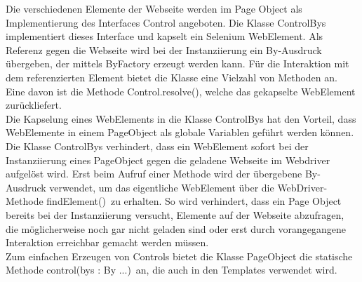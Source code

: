 Die verschiedenen Elemente der Webseite werden im Page Object als Implementierung des Interfaces Control angeboten.
Die Klasse ControlBys implementiert dieses Interface und kapselt ein Selenium WebElement. Als Referenz gegen die Webseite wird bei der Instanziierung ein By-Ausdruck übergeben, der mittels ByFactory erzeugt werden kann.
Für die Interaktion mit dem referenzierten Element bietet die Klasse eine Vielzahl von Methoden an. Eine davon ist die Methode \grq Control.resolve()\grq, welche das gekapselte WebElement zurückliefert.\\
Die Kapselung eines WebElements in die Klasse ControlBys hat den Vorteil, dass WebElemente in einem PageObject als globale Variablen geführt werden können.
Die Klasse ControlBys verhindert, dass ein WebElement sofort bei der Instanziierung eines PageObject gegen die geladene Webseite im Webdriver aufgelöst wird. Erst beim Aufruf einer Methode wird der übergebene By-Ausdruck verwendet, um das eigentliche WebElement über die WebDriver-Methode \grq findElement()\grq\ zu erhalten.
So wird verhindert, dass ein Page Object bereits bei der Instanziierung versucht, Elemente auf der Webseite abzufragen, die möglicherweise noch gar nicht geladen sind oder erst durch vorangegangene Interaktion erreichbar gemacht werden müssen.\\ Zum einfachen Erzeugen von Controls bietet die Klasse PageObject die statische Methode \grq control(bys : By ...)\grq\ an, die auch in den Templates verwendet wird.



